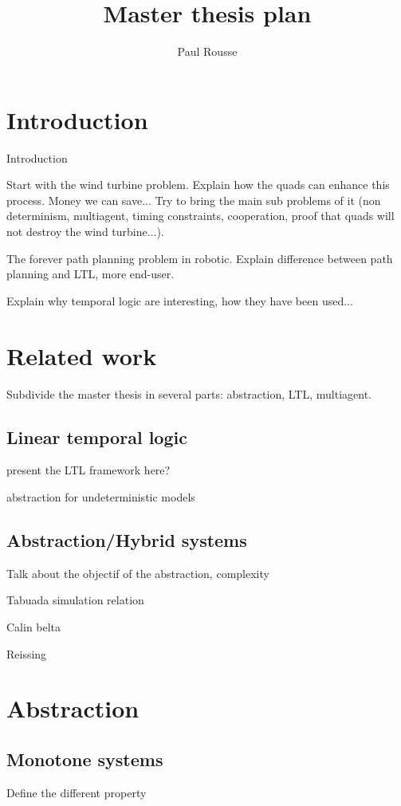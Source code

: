 \documentclass[notitlepage]{article}
\theoremstyle{named}
\begin{document}
\title{Master thesis plan}
\author{Paul Rousse}

\maketitle


\section{Introduction}
Introduction

Start with the wind turbine problem. Explain how the quads can enhance this process. Money we can save... Try to bring the main sub problems of it (non determinism, multiagent, timing constraints, cooperation, proof that quads will not destroy the wind turbine...).

The forever path planning problem in robotic. Explain difference between path planning and LTL, more end-user.

Explain why temporal logic are interesting, how they have been used...


\section{Related work}
Subdivide the master thesis in several parts: abstraction, LTL, multiagent.

\subsection{Linear temporal logic}
present the LTL framework here?

abstraction for undeterministic models

\subsection{Abstraction/Hybrid systems}
Talk about the objectif of the abstraction, complexity 

Tabuada
simulation relation

Calin belta

Reissing


\section{Abstraction}

\subsection{Monotone systems}
Define the different property
\end{document}
